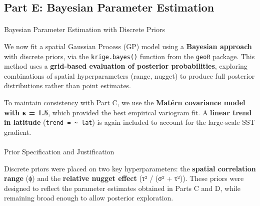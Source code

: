 \documentclass[
  11pt,
]{article}
\makeatletter
\let\oldparagraph\paragraph
\renewcommand{\paragraph}{
    \@ifstar
      \xxxParagraphStar
      \xxxParagraphNoStar
  }
\newcommand{\xxxParagraphStar}[1]{\oldparagraph*{#1}\mbox{}}
\newcommand{\xxxParagraphNoStar}[1]{\oldparagraph{#1}\mbox{}}
\makeatother
\begin{document}
\subsection{Part E: Bayesian Parameter
Estimation}\label{part-e-bayesian-parameter-estimation}

\paragraph{Bayesian Parameter Estimation with Discrete
Priors}\label{bayesian-parameter-estimation-with-discrete-priors}

We now fit a spatial Gaussian Process (GP) model using a
\textbf{Bayesian approach} with discrete priors, via the
\texttt{krige.bayes()} function from the \texttt{geoR} package. This
method uses a \textbf{grid-based evaluation of posterior probabilities},
exploring combinations of spatial hyperparameters (range, nugget) to
produce full posterior distributions rather than point estimates.

To maintain consistency with Part C, we use the \textbf{Matérn
covariance model with κ = 1.5}, which provided the best empirical
variogram fit. A \textbf{linear trend in latitude}
(\texttt{trend\ =\ \textasciitilde{}\ lat}) is again included to account
for the large-scale SST gradient.

\paragraph{Prior Specification and
Justification}\label{prior-specification-and-justification}

Discrete priors were placed on two key hyperparameters: the
\textbf{spatial correlation range} (ϕ) and the \textbf{relative nugget
effect} (τ² / (σ² + τ²)). These priors were designed to reflect the
parameter estimates obtained in Parts C and D, while remaining broad
enough to allow posterior exploration.
\end{document}
